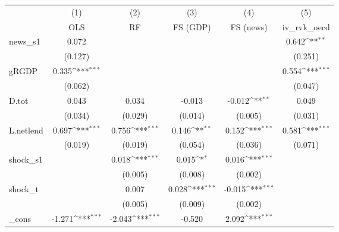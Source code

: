 {
\def\sym#1{\ifmmode^{#1}\else\(^{#1}\)\fi}
\begin{tabular}{l*{5}{c}}
\toprule
            &\multicolumn{1}{c}{(1)}&\multicolumn{1}{c}{(2)}&\multicolumn{1}{c}{(3)}&\multicolumn{1}{c}{(4)}&\multicolumn{1}{c}{(5)}\\
            &\multicolumn{1}{c}{OLS}&\multicolumn{1}{c}{RF}&\multicolumn{1}{c}{FS (GDP)}&\multicolumn{1}{c}{FS (news)}&\multicolumn{1}{c}{iv\_rvk\_oecd}\\
\midrule
news\_s1     &       0.072         &                     &                     &                     &       0.642\sym{**} \\
            &     (0.127)         &                     &                     &                     &     (0.251)         \\
\addlinespace
gRGDP       &       0.335\sym{***}&                     &                     &                     &       0.554\sym{***}\\
            &     (0.062)         &                     &                     &                     &     (0.047)         \\
\addlinespace
D.tot       &       0.043         &       0.034         &      -0.013         &      -0.012\sym{**} &       0.049         \\
            &     (0.034)         &     (0.029)         &     (0.014)         &     (0.005)         &     (0.031)         \\
\addlinespace
L.netlend   &       0.697\sym{***}&       0.756\sym{***}&       0.146\sym{**} &       0.152\sym{***}&       0.581\sym{***}\\
            &     (0.019)         &     (0.019)         &     (0.054)         &     (0.036)         &     (0.071)         \\
\addlinespace
shock\_s1    &                     &       0.018\sym{***}&       0.015\sym{*}  &       0.016\sym{***}&                     \\
            &                     &     (0.005)         &     (0.008)         &     (0.002)         &                     \\
\addlinespace
shock\_t     &                     &       0.007         &       0.028\sym{***}&      -0.015\sym{***}&                     \\
            &                     &     (0.005)         &     (0.009)         &     (0.002)         &                     \\
\addlinespace
\_cons      &      -1.271\sym{***}&      -2.043\sym{***}&      -0.520         &       2.092\sym{***}&                     \\

\end{tabular}}
